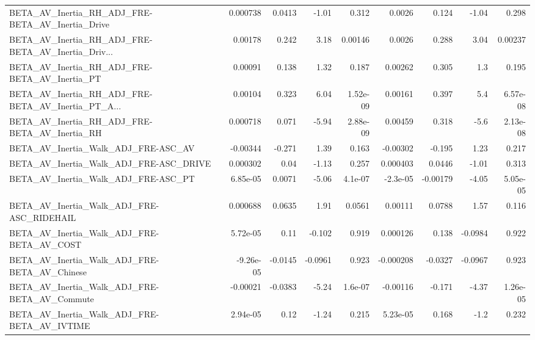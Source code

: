 \begin{tabular}{lrrrrrrrr}
BETA\_AV\_Inertia\_RH\_ADJ\_FRE-BETA\_AV\_Inertia\_Drive   &    0.000738 &       0.0413 &    -1.01 &    0.312 &     0.0026 &       0.124 &        -1.04 &         0.298 \\
BETA\_AV\_Inertia\_RH\_ADJ\_FRE-BETA\_AV\_Inertia\_Driv... &     0.00178 &        0.242 &     3.18 &  0.00146 &     0.0026 &       0.288 &         3.04 &       0.00237 \\
BETA\_AV\_Inertia\_RH\_ADJ\_FRE-BETA\_AV\_Inertia\_PT      &     0.00091 &        0.138 &     1.32 &    0.187 &    0.00262 &       0.305 &          1.3 &         0.195 \\
BETA\_AV\_Inertia\_RH\_ADJ\_FRE-BETA\_AV\_Inertia\_PT\_A... &     0.00104 &        0.323 &     6.04 & 1.52e-09 &    0.00161 &       0.397 &          5.4 &      6.57e-08 \\
BETA\_AV\_Inertia\_RH\_ADJ\_FRE-BETA\_AV\_Inertia\_RH      &    0.000718 &        0.071 &    -5.94 & 2.88e-09 &    0.00459 &       0.318 &         -5.6 &      2.13e-08 \\
BETA\_AV\_Inertia\_Walk\_ADJ\_FRE-ASC\_AV                &    -0.00344 &       -0.271 &     1.39 &    0.163 &   -0.00302 &      -0.195 &         1.23 &         0.217 \\
BETA\_AV\_Inertia\_Walk\_ADJ\_FRE-ASC\_DRIVE             &    0.000302 &         0.04 &    -1.13 &    0.257 &   0.000403 &      0.0446 &        -1.01 &         0.313 \\
BETA\_AV\_Inertia\_Walk\_ADJ\_FRE-ASC\_PT                &    6.85e-05 &       0.0071 &    -5.06 &  4.1e-07 &   -2.3e-05 &    -0.00179 &        -4.05 &      5.05e-05 \\
BETA\_AV\_Inertia\_Walk\_ADJ\_FRE-ASC\_RIDEHAIL          &    0.000688 &       0.0635 &     1.91 &   0.0561 &    0.00111 &      0.0788 &         1.57 &         0.116 \\
BETA\_AV\_Inertia\_Walk\_ADJ\_FRE-BETA\_AV\_COST          &    5.72e-05 &         0.11 &   -0.102 &    0.919 &   0.000126 &       0.138 &      -0.0984 &         0.922 \\
BETA\_AV\_Inertia\_Walk\_ADJ\_FRE-BETA\_AV\_Chinese       &   -9.26e-05 &      -0.0145 &  -0.0961 &    0.923 &  -0.000208 &     -0.0327 &      -0.0967 &         0.923 \\
BETA\_AV\_Inertia\_Walk\_ADJ\_FRE-BETA\_AV\_Commute       &    -0.00021 &      -0.0383 &    -5.24 &  1.6e-07 &   -0.00116 &      -0.171 &        -4.37 &      1.26e-05 \\
BETA\_AV\_Inertia\_Walk\_ADJ\_FRE-BETA\_AV\_IVTIME        &    2.94e-05 &         0.12 &    -1.24 &    0.215 &   5.23e-05 &       0.168 &         -1.2 &         0.232 \\

\end{tabular}
